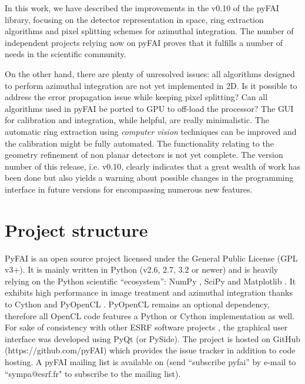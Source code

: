 \documentclass{iucr}
\begin{document}
In this work, we have described the improvements in the
v0.10 of the pyFAI library, focusing on the detector representation in space, ring
extraction algorithms and pixel splitting schemes for azimuthal integration.
The number of independent projects relying now on pyFAI proves that it fulfills a
number of needs in the scientific community.

On the other hand, there are plenty of unresolved issues: all
algorithms designed to perform azimuthal integration are not yet implemented in
2D. Is it possible to address the error propagation issue while keeping pixel
splitting? Can all algorithms used in pyFAI be ported to GPU to off-load the
processor? The GUI for calibration and integration, while helpful, are really
minimalistic.
The automatic ring extraction using \textit{computer vision} techniques can
be improved and the calibration might be fully automated.
The functionality relating to the geometry refinement of non planar
detectors is not yet complete.
The version number of this release, i.e. v0.10, clearly indicates that a great
wealth of work has been done but also yields a warning about possible changes
in the programming interface in future versions for encompassing numerous new
features.



\appendix
\section{Project structure}

PyFAI is an open source project licensed under the General Public License (GPL
v3+).
It is mainly written in Python (v2.6, 2.7, 3.2 or newer) and is
heavily relying on the Python scientific ``ecosystem'': NumPy \cite{numpy}, SciPy \cite{scipy} and Matplotlib \cite{matplotlib}.
It exhibits high performance in image treatment and azimuthal integration
thanks to Cython \cite{cython} and PyOpenCL \cite{pyopencl}.
PyOpenCL remains an optional dependency, therefore all OpenCL code features a
Python or Cython implementation as well.
For sake of consistency with other ESRF software projects \cite{pymca}, the
graphical user interface was developed using PyQt (or PySide).
The project is hosted on GitHub (https://github.com/pyFAI) which provides
the issue tracker in addition to code hosting.
A pyFAI mailing list is
available on  (send ``subscribe pyfai'' by e-mail to
``sympa@esrf.fr" to subscribe to the mailing list).
\end{document}
